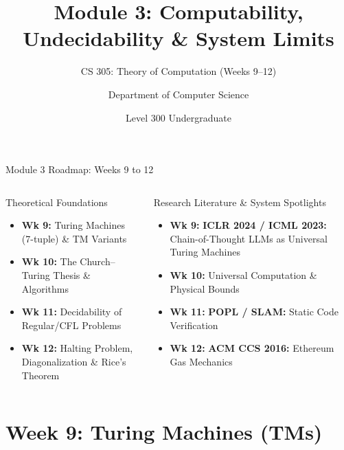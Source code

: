 \documentclass[aspectratio=169,10pt]{beamer}
\title[CS 305 $|$ Module 3]{Module 3: Computability, Undecidability \& System Limits}
\subtitle{CS 305: Theory of Computation (Weeks 9--12)}
\author[GIMPA School of Technology]{Department of Computer Science}
\institute[GIMPA]{Ghana Institute of Management and Public Administration (GIMPA)}
\date{Level 300 Undergraduate}
\begin{document}
\begin{frame}
    \titlepage
\end{frame}

\begin{frame}{Module 3 Roadmap: Weeks 9 to 12}
    \begin{columns}[T]
        \begin{block}{Theoretical Foundations}
            \begin{itemize}\setlength{\itemsep}{3pt}
                \item \textbf{Wk 9:} Turing Machines (7-tuple) \& TM Variants
                \item \textbf{Wk 10:} The Church--Turing Thesis \& Algorithms
                \item \textbf{Wk 11:} Decidability of Regular/CFL Problems
                \item \textbf{Wk 12:} Halting Problem, Diagonalization \& Rice's Theorem
            \end{itemize}
        \end{block}
        
        \begin{alertblock}{Research Literature \& System Spotlights}
            \begin{itemize}\setlength{\itemsep}{3pt}
                \item \textbf{Wk 9:} \textbf{ICLR 2024 / ICML 2023:} Chain-of-Thought LLMs as Universal Turing Machines
                \item \textbf{Wk 10:} Universal Computation \& Physical Bounds
                \item \textbf{Wk 11:} \textbf{POPL / SLAM:} Static Code Verification
                \item \textbf{Wk 12:} \textbf{ACM CCS 2016:} Ethereum Gas Mechanics
            \end{itemize}
        \end{alertblock}
    \end{columns}
\end{frame}

\section{Week 9: Turing Machines (TMs)}
\end{document}
